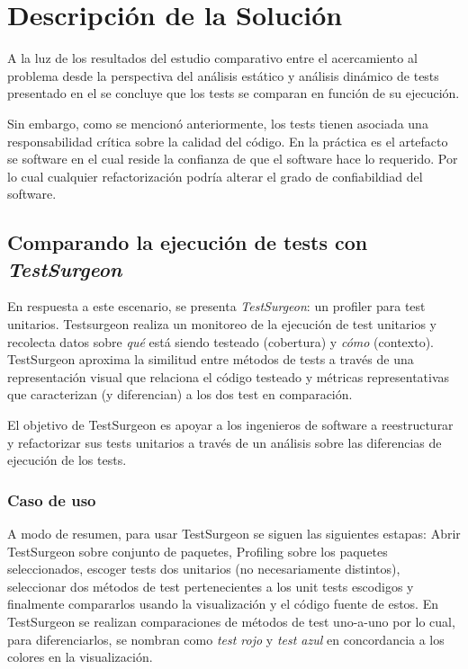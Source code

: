 \chapter{Descripción de la Solución}



\par A la luz de los resultados del estudio comparativo entre el acercamiento al problema desde la perspectiva del análisis estático y análisis dinámico de  tests presentado en el  se concluye que los tests se comparan en función de su ejecución. 

\par Sin embargo, como se mencionó anteriormente, los tests tienen asociada una responsabilidad crítica sobre la calidad del código. En la práctica es el artefacto se software en el cual reside la confianza de que el software hace lo requerido. Por lo cual cualquier refactorización podría alterar el grado de confiabildiad del software.


\section{Comparando la ejecución de tests con \emph{TestSurgeon}}

\par En respuesta a este escenario, se presenta \emph{TestSurgeon}: un profiler para test unitarios. Testsurgeon realiza un monitoreo de la ejecución de test unitarios y recolecta datos sobre \emph{qué} está siendo testeado (cobertura) y \emph{cómo} (contexto). TestSurgeon aproxima la similitud entre métodos de tests a través de una representación visual que relaciona el código testeado y métricas representativas que caracterizan (y diferencian) a los dos test en comparación. 

\par El objetivo de TestSurgeon es apoyar a los ingenieros de software a reestructurar y refactorizar sus tests unitarios a través de un análisis sobre las diferencias de ejecución de los tests.

\subsection{Caso de uso}
\par A modo de resumen, para usar TestSurgeon se siguen las siguientes estapas: Abrir TestSurgeon sobre conjunto de paquetes, Profiling sobre los paquetes seleccionados, escoger tests dos unitarios (no necesariamente distintos), seleccionar dos métodos de test pertenecientes a los unit tests escodigos y finalmente compararlos usando la visualización y el código fuente de estos. En TestSurgeon se realizan comparaciones de métodos de test uno-a-uno por lo cual, para diferenciarlos, se nombran como \emph{test rojo} y \emph{test azul} en concordancia a los colores en la visualización.

